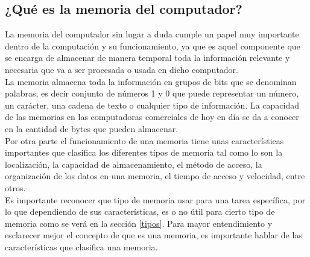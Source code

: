 \documentclass{article}
\begin{document}
\subsection{¿Qué es la memoria del computador?} \label{contenido}
La memoria del computador sin lugar a duda cumple un papel muy importante dentro de la computación y su funcionamiento, ya que es aquel componente que se encarga de almacenar de manera temporal toda la información relevante y necesaria que va a ser procesada o usada en dicho computador.\cite{augusto}\\

La memoria almacena toda la información en grupos de bits que se denominan palabras, es decir conjunto de números 1 y 0 que puede representar un número, un carácter, una cadena de texto o cualquier tipo de información. La capacidad de las memorias en las computadoras comerciales de hoy en día se da a conocer en la cantidad de bytes que pueden almacenar. \cite{arquitectura}\\

Por otra parte el funcionamiento de una memoria tiene unas características importantes que clasifica los diferentes tipos de memoria tal como lo son la localización, la capacidad de almacenamiento, el método de acceso, la organización de los datos en una memoria, el tiempo de acceso y velocidad, entre otros.\\


Es importante reconocer que tipo de memoria usar para una tarea específica, por lo que dependiendo de sus características, es o no útil para cierto tipo de memoria como se verá en la sección \ref{tipos}. Para mayor entendimiento y esclarecer mejor el concepto de que es una memoria, es importante hablar de las características que clasifica una memoria.
\end{document}
